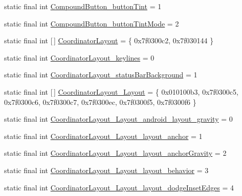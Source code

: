 \begin{DoxyCompactItemize}
static final int \mbox{\hyperlink{classandroid_1_1support_1_1design_1_1R_1_1styleable_a25cff95b0d756209d7642094cbd4e19d}{Compound\+Button\+\_\+button\+Tint}} = 1
\item 
static final int \mbox{\hyperlink{classandroid_1_1support_1_1design_1_1R_1_1styleable_a11e8a842e9e3521d89857eb2305fcbb8}{Compound\+Button\+\_\+button\+Tint\+Mode}} = 2
\item 
static final int \mbox{[}$\,$\mbox{]} \mbox{\hyperlink{classandroid_1_1support_1_1design_1_1R_1_1styleable_aa61378a506fc889e9e7af20a32b5fa05}{Coordinator\+Layout}} = \{ 0x7f0300c2, 0x7f030144 \}
\item 
static final int \mbox{\hyperlink{classandroid_1_1support_1_1design_1_1R_1_1styleable_ac5dda80c68ac3d8d0bcb7678440d480b}{Coordinator\+Layout\+\_\+keylines}} = 0
\item 
static final int \mbox{\hyperlink{classandroid_1_1support_1_1design_1_1R_1_1styleable_ae040b68b75d343e4cf3c87d18acb3605}{Coordinator\+Layout\+\_\+status\+Bar\+Background}} = 1
\item 
static final int \mbox{[}$\,$\mbox{]} \mbox{\hyperlink{classandroid_1_1support_1_1design_1_1R_1_1styleable_a3646925ce337cd6de11e60a4cff99e3a}{Coordinator\+Layout\+\_\+\+Layout}} = \{ 0x010100b3, 0x7f0300c5, 0x7f0300c6, 0x7f0300c7, 0x7f0300ec, 0x7f0300f5, 0x7f0300f6 \}
\item 
static final int \mbox{\hyperlink{classandroid_1_1support_1_1design_1_1R_1_1styleable_a46dbd9e454b13320d280d9f354b24edc}{Coordinator\+Layout\+\_\+\+Layout\+\_\+android\+\_\+layout\+\_\+gravity}} = 0
\item 
static final int \mbox{\hyperlink{classandroid_1_1support_1_1design_1_1R_1_1styleable_aa98d5a28d6e19b7dfd984a765c0853b9}{Coordinator\+Layout\+\_\+\+Layout\+\_\+layout\+\_\+anchor}} = 1
\item 
static final int \mbox{\hyperlink{classandroid_1_1support_1_1design_1_1R_1_1styleable_ad43d74622cee0a43176d15c74b03d153}{Coordinator\+Layout\+\_\+\+Layout\+\_\+layout\+\_\+anchor\+Gravity}} = 2
\item 
static final int \mbox{\hyperlink{classandroid_1_1support_1_1design_1_1R_1_1styleable_a497df3ffa4a96f763704dd46022df3d2}{Coordinator\+Layout\+\_\+\+Layout\+\_\+layout\+\_\+behavior}} = 3
\item 
static final int \mbox{\hyperlink{classandroid_1_1support_1_1design_1_1R_1_1styleable_a153c15e86abfb5cb543300b63eefd5fd}{Coordinator\+Layout\+\_\+\+Layout\+\_\+layout\+\_\+dodge\+Inset\+Edges}} = 4
\item 

\end{DoxyCompactItemize}
